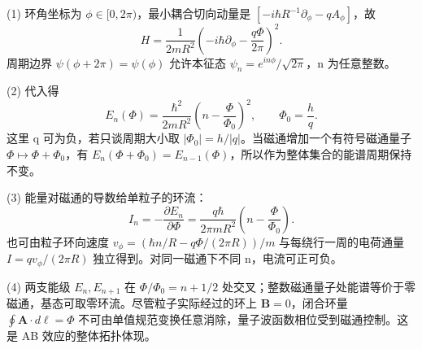 (1) 环角坐标为 \(\phi\in[0,2\pi)\)，最小耦合切向动量是 \([-i\hbar R^{-1}\partial_\phi-qA_\phi]\)，故
\[
H=\frac1{2mR^2}\left(-i\hbar\partial_\phi-\frac{q\Phi}{2\pi}\right)^2.
\]
周期边界 \(\psi(\phi+2\pi)=\psi(\phi)\) 允许本征态 \(\psi_n=e^{in\phi}/\sqrt{2\pi}\)，n 为任意整数。

(2) 代入得
\[
E_n(\Phi)=\frac{\hbar^2}{2mR^2}
\left(n-\frac{\Phi}{\Phi_0}\right)^2,\qquad
\Phi_0=\frac{h}{q}.
\]
这里 q 可为负，若只谈周期大小取 \(|\Phi_0|=h/|q|\)。当磁通增加一个有符号磁通量子 \(\Phi\mapsto\Phi+\Phi_0\)，有 \(E_n(\Phi+\Phi_0)=E_{n-1}(\Phi)\)，所以作为整体集合的能谱周期保持不变。

(3) 能量对磁通的导数给单粒子的环流：
\[
I_n=-\frac{\partial E_n}{\partial\Phi}
=\frac{q\hbar}{2\pi mR^2}
\left(n-\frac{\Phi}{\Phi_0}\right).
\]
也可由粒子环向速度 \(v_\phi=(\hbar n/R-q\Phi/(2\pi R))/m\) 与每绕行一周的电荷通量 \(I=qv_\phi/(2\pi R)\) 独立得到。对同一磁通下不同 n，电流可正可负。

(4) 两支能级 \(E_n,E_{n+1}\) 在 \(\Phi/\Phi_0=n+1/2\) 处交叉；整数磁通量子处能谱等价于零磁通，基态可取零环流。尽管粒子实际经过的环上 \(\boldsymbol B=0\)，闭合环量 \(\oint\boldsymbol A\cdot d\boldsymbol\ell=\Phi\) 不可由单值规范变换任意消除，量子波函数相位受到磁通控制。这是 AB 效应的整体拓扑体现。
